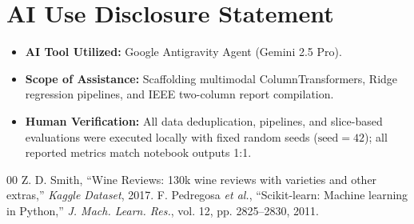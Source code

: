 \documentclass[conference]{IEEEtran}
\begin{document}
\newpage
\section*{AI Use Disclosure Statement}
\begin{itemize}
\item \textbf{AI Tool Utilized:} Google Antigravity Agent (Gemini 2.5 Pro).
\item \textbf{Scope of Assistance:} Scaffolding multimodal ColumnTransformers, Ridge regression pipelines, and IEEE two-column report compilation.
\item \textbf{Human Verification:} All data deduplication, pipelines, and slice-based evaluations were executed locally with fixed random seeds ($\text{seed}=42$); all reported metrics match notebook outputs 1:1.
\end{itemize}

\begin{thebibliography}{00}
 Z. D. Smith, ``Wine Reviews: 130k wine reviews with varieties and other extras,'' \textit{Kaggle Dataset}, 2017.
 F. Pedregosa \textit{et al.}, ``Scikit-learn: Machine learning in Python,'' \textit{J. Mach. Learn. Res.}, vol. 12, pp. 2825--2830, 2011.
\end{thebibliography}
\end{document}
